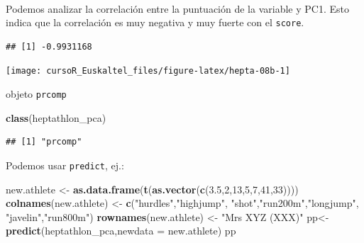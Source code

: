 \documentclass[]{book}
\newenvironment{Shaded}{\begin{snugshade}}{\end{snugshade}}
\newcommand{\KeywordTok}[1]{\textcolor[rgb]{0.13,0.29,0.53}{\textbf{#1}}}
\newcommand{\DataTypeTok}[1]{\textcolor[rgb]{0.13,0.29,0.53}{#1}}
\newcommand{\DecValTok}[1]{\textcolor[rgb]{0.00,0.00,0.81}{#1}}
\newcommand{\FloatTok}[1]{\textcolor[rgb]{0.00,0.00,0.81}{#1}}
\newcommand{\StringTok}[1]{\textcolor[rgb]{0.31,0.60,0.02}{#1}}
\newcommand{\OperatorTok}[1]{\textcolor[rgb]{0.81,0.36,0.00}{\textbf{#1}}}
\newcommand{\NormalTok}[1]{#1}
\begin{document}
~

Podemos analizar la correlación entre la puntuación de la variable y
PC1. Esto indica que la correlación es muy negativa y muy fuerte con el
\texttt{score}.

\begin{Shaded}
\end{Shaded}

\begin{verbatim}
## [1] -0.9931168
\end{verbatim}

\begin{Shaded}
\end{Shaded}

\begin{center}\texttt{[image: cursoR\_Euskaltel\_files/figure-latex/hepta-08b-1]} \end{center}

objeto \texttt{prcomp}

\begin{Shaded}
\begin{Highlighting}[]
\KeywordTok{class}\NormalTok{(heptathlon_pca)}
\end{Highlighting}
\end{Shaded}

\begin{verbatim}
## [1] "prcomp"
\end{verbatim}

Podemos usar \texttt{predict}, ej.:

\begin{Shaded}
\begin{Highlighting}[]
\NormalTok{new.athlete <-}\StringTok{ }\KeywordTok{as.data.frame}\NormalTok{(}\KeywordTok{t}\NormalTok{(}\KeywordTok{as.vector}\NormalTok{(}\KeywordTok{c}\NormalTok{(}\FloatTok{3.5}\NormalTok{,}\DecValTok{2}\NormalTok{,}\DecValTok{13}\NormalTok{,}\DecValTok{5}\NormalTok{,}\DecValTok{7}\NormalTok{,}\DecValTok{41}\NormalTok{,}\DecValTok{33}\NormalTok{))))}
\KeywordTok{colnames}\NormalTok{(new.athlete) <-}\StringTok{ }\KeywordTok{c}\NormalTok{(}\StringTok{"hurdles"}\NormalTok{,}\StringTok{"highjump"}\NormalTok{,}
                           \StringTok{"shot"}\NormalTok{,}\StringTok{"run200m"}\NormalTok{,}\StringTok{"longjump"}\NormalTok{,}
                           \StringTok{"javelin"}\NormalTok{,}\StringTok{"run800m"}\NormalTok{)}
\KeywordTok{rownames}\NormalTok{(new.athlete) <-}\StringTok{ "Mrs XYZ (XXX)"}
\NormalTok{pp<-}\KeywordTok{predict}\NormalTok{(heptathlon_pca,}\DataTypeTok{newdata =}\NormalTok{ new.athlete)}
\NormalTok{pp}
\end{Highlighting}
\end{Shaded}
\end{document}
